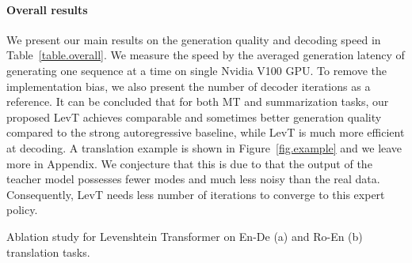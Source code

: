 \documentclass{article}
\begin{document}
\paragraph{Overall results} 
We present our main results on the generation quality and decoding speed in Table~\ref{table.overall}. We measure the speed by the averaged generation latency of generating one sequence at a time on single Nvidia V100 GPU. To remove the implementation bias, we also present the number of decoder iterations as a reference. It can be concluded that for both MT and summarization tasks, our proposed LevT achieves comparable and sometimes better generation quality compared to the strong autoregressive baseline, while LevT is much more efficient at decoding. A translation example is shown in Figure~\ref{fig.example} and we leave more in Appendix.
We conjecture that this is due to that the output of the teacher model possesses fewer modes and much less noisy than the real data. Consequently, LevT needs less number of iterations to converge to this expert policy.

\begin{table}[t]\centering
    \caption{Ablation study for Levenshtein Transformer on En-De (a) and  Ro-En (b) translation tasks.}
\end{table}
\end{document}
